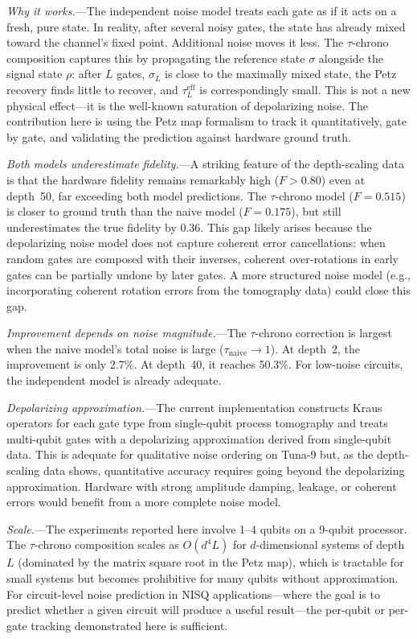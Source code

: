 \documentclass[prl,twocolumn,superscriptaddress,longbibliography]{revtex4-2}
\begin{document}
\emph{Why it works.}---The independent noise model treats each gate as if it acts on a fresh, pure state. In reality, after several noisy gates, the state has already mixed toward the channel's fixed point. Additional noise moves it less. The $\tau$-chrono composition captures this by propagating the reference state $\sigma$ alongside the signal state $\rho$: after $L$ gates, $\sigma_L$ is close to the maximally mixed state, the Petz recovery finds little to recover, and $\tau_L^{\text{eff}}$ is correspondingly small. This is not a new physical effect---it is the well-known saturation of depolarizing noise. The contribution here is using the Petz map formalism to track it quantitatively, gate by gate, and validating the prediction against hardware ground truth.

\emph{Both models underestimate fidelity.}---A striking feature of the depth-scaling data is that the hardware fidelity remains remarkably high ($F > 0.80$) even at depth~50, far exceeding both model predictions. The $\tau$-chrono model ($F = 0.515$) is closer to ground truth than the naive model ($F = 0.175$), but still underestimates the true fidelity by 0.36. This gap likely arises because the depolarizing noise model does not capture coherent error cancellations: when random gates are composed with their inverses, coherent over-rotations in early gates can be partially undone by later gates. A more structured noise model (e.g., incorporating coherent rotation errors from the tomography data) could close this gap.

\emph{Improvement depends on noise magnitude.}---The $\tau$-chrono correction is largest when the naive model's total noise is large ($\tau_{\text{naive}} \to 1$). At depth~2, the improvement is only 2.7\%. At depth~40, it reaches 50.3\%. For low-noise circuits, the independent model is already adequate.

\emph{Depolarizing approximation.}---The current implementation constructs Kraus operators for each gate type from single-qubit process tomography and treats multi-qubit gates with a depolarizing approximation derived from single-qubit data. This is adequate for qualitative noise ordering on Tuna-9 but, as the depth-scaling data shows, quantitative accuracy requires going beyond the depolarizing approximation. Hardware with strong amplitude damping, leakage, or coherent errors would benefit from a more complete noise model.

\emph{Scale.}---The experiments reported here involve 1--4 qubits on a 9-qubit processor. The $\tau$-chrono composition scales as $O(d^4 L)$ for $d$-dimensional systems of depth $L$ (dominated by the matrix square root in the Petz map), which is tractable for small systems but becomes prohibitive for many qubits without approximation. For circuit-level noise prediction in NISQ applications---where the goal is to predict whether a given circuit will produce a useful result---the per-qubit or per-gate tracking demonstrated here is sufficient.
\end{document}
